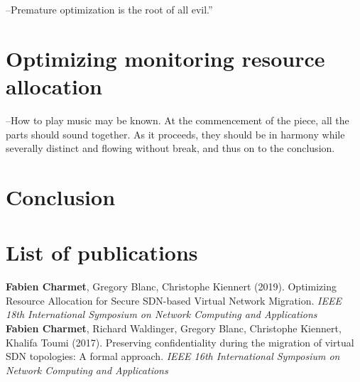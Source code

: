 \documentclass[a4paper, 11pt]{report}
\newcommand{\boxedtext}[1]{\fbox{\scriptsize\bfseries\textsf{#1}}}
\newcommand{\myremark}[2]{
   \textcolor{blue}{\boxedtext{#1}
      {\small$\blacktriangleright$\emph{\textsl{#2}}$\blacktriangleleft$}
}}
\newcommand\FC[1]{\myremark{FC}{#1}}
\theoremstyle{definition}
\begin{document}
\newpage
\begin{savequote}
--Premature optimization is the root of all evil.”
\end{savequote}
\chapter{Optimizing monitoring resource allocation}
\label{sec:RAprob}






\newpage
\begin{savequote}
--How to play music may be known. At the commencement of the piece, all the parts should sound together. As it proceeds, they should be in harmony while severally distinct and flowing without break, and thus on to the conclusion.
\end{savequote}
\chapter{Conclusion}


\newpage
\chapter*{List of publications}
\textbf{Fabien Charmet}, Gregory Blanc, Christophe Kiennert (2019). Optimizing Resource Allocation for Secure SDN-based Virtual Network Migration. \textit{IEEE 18th International Symposium on Network Computing and Applications}\\

\textbf{Fabien Charmet}, Richard Waldinger, Gregory Blanc, Christophe Kiennert, Khalifa Toumi (2017). Preserving confidentiality during the migration of virtual SDN topologies: A formal approach. \textit{IEEE 16th International Symposium on Network Computing and Applications}

\newpage


\newpage
{}




% 
% 
\end{document}
